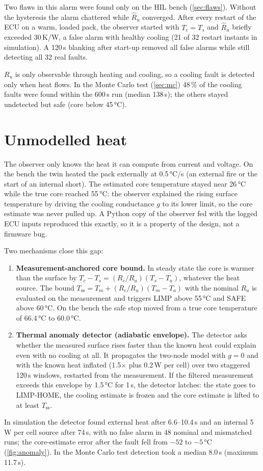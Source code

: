 Two flaws in this alarm were found only on the HIL bench (\cref{sec:flaws}). Without the hysteresis the alarm chattered while $\hat R_u$ converged. After every restart of the ECU on a warm, loaded pack, the observer started with $T_c = T_s$ and $\hat R_u$ briefly exceeded 30\,K/W, a false alarm with healthy cooling (21 of 32 restart instants in simulation). A 120\,s blanking after start-up removed all false alarms while still detecting all 32 real faults.

$R_u$ is only observable through heating and cooling, so a cooling fault is detected only when heat flows. In the Monte Carlo test (\cref{sec:mc}) 48\,\% of the cooling faults were found within the 600\,s run (median 138\,s); the others stayed undetected but safe (core below 45\,°C).


\section{Unmodelled heat}\label{sec:anomaly}
The observer only knows the heat it can compute from current and voltage. On the bench the twin heated the pack externally at 0.5\,°C/s (an external fire or the start of an internal short). The estimated core temperature stayed near 26\,°C while the true core reached 55\,°C: the observer explained the rising surface temperature by driving the cooling conductance $g$ to its lower limit, so the core estimate was never pulled up. A Python copy of the observer fed with the logged ECU inputs reproduced this exactly, so it is a property of the design, not a firmware bug.

Two mechanisms close this gap:
\begin{enumerate}
  \item \textbf{Measurement-anchored core bound.} In steady state the core is warmer than the surface by $T_c - T_s = (R_c/R_u)(T_s - T_a)$, whatever the heat source. The bound $T_\mathrm{ss} = T_m + (R_c/R_u)(T_m - T_a)$ with the nominal $R_u$ is evaluated on the measurement and triggers LIMP above 55\,°C and SAFE above 60\,°C. On the bench the safe stop moved from a true core temperature of 66.4\,°C to 60.0\,°C.
  \item \textbf{Thermal anomaly detector (adiabatic envelope).} The detector asks whether the measured surface rises faster than the known heat could explain even with no cooling at all. It propagates the two-node model with $g = 0$ and with the known heat inflated (1.5$\times$ plus 0.2\,W per cell) over two staggered 120\,s windows, restarted from the measurement. If the filtered measurement exceeds this envelope by 1.5\,°C for 1\,s, the detector latches: the state goes to LIMP-HOME, the cooling estimate is frozen and the core estimate is lifted to at least $T_\mathrm{ss}$.
\end{enumerate}
In simulation the detector found external heat after 6.6--10.4\,s and an internal 5\,W per cell source after 74\,s, with no false alarm in 48 nominal and mismatched runs; the core-estimate error after the fault fell from $-52$ to $-5$\,°C (\cref{fig:anomaly}). In the Monte Carlo test detection took a median 8.0\,s (maximum 11.7\,s).

